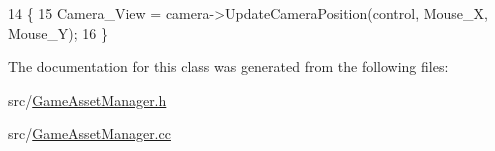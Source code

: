 \begin{DoxyCode}
14                                                                                      \{
15         Camera\_View = camera->UpdateCameraPosition(control, Mouse\_X, Mouse\_Y);
16   \}
\end{DoxyCode}


The documentation for this class was generated from the following files\+:\begin{DoxyCompactItemize}
\item 
src/\hyperlink{_game_asset_manager_8h}{Game\+Asset\+Manager.\+h}\item 
src/\hyperlink{_game_asset_manager_8cc}{Game\+Asset\+Manager.\+cc}\end{DoxyCompactItemize}
